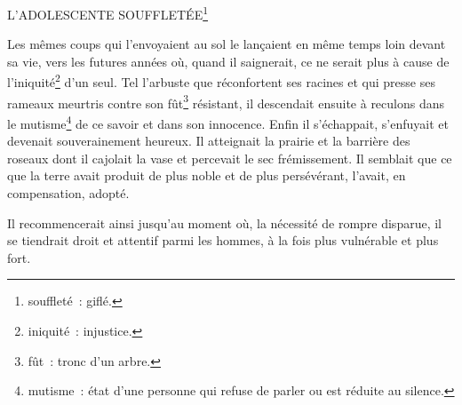 
	{\begin{center}
	L'ADOLESCENTE SOUFFLETÉE\footnote{souffleté~: giflé.}
	\end{center}

	
	Les mêmes coups qui l'envoyaient au sol le lançaient en même temps loin devant sa vie, vers les futures années où, quand il saignerait, ce ne serait plus à cause de l'iniquité\footnote{iniquité~: injustice.} d'un seul. Tel l'arbuste que réconfortent ses racines et qui presse ses rameaux meurtris contre son fût\footnote{fût~: tronc d'un arbre.} résistant, il descendait ensuite à reculons dans le mutisme\footnote{mutisme~: état d'une personne qui refuse de parler ou est réduite au silence.} de ce savoir et dans son innocence. Enfin il s'échappait, s'enfuyait et devenait souverainement heureux. Il atteignait la prairie et la barrière des roseaux dont il cajolait la vase et percevait le sec frémissement. Il semblait que ce que la terre avait produit de plus noble et de plus persévérant, l'avait, en compensation, adopté.
	
Il recommencerait ainsi jusqu'au moment où, la nécessité de rompre disparue, il se tiendrait droit et attentif parmi les hommes, à la fois plus vulnérable et plus fort.
}


